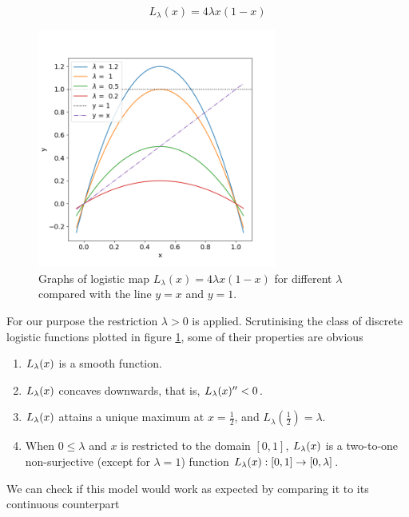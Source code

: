 \begin{equation}\label{eq_logistic}
	L_{\lambda}(x) = 4 \lambda x(1-x)
\end{equation}

\begin{figure}[t]
	\centering
	\includegraphics[width=0.7\textwidth]{./figures/logistic_map_diff_lambda.png}
	\caption{Graphs of logistic map $L_{\lambda}(x) = 4 \lambda x(1-x)$ for different $\lambda$ compared with the line $y=x$ and $y = 1$.} 
	\label{fig:logistic_map_diff_lambda}
\end{figure}


For our purpose the restriction $\lambda >0$ is applied.
Scrutinising the class of discrete logistic functions plotted in figure \ref{fig:logistic_map_diff_lambda}, some of their properties are obvious

\begin{enumerate}
	\item $L_{\lambda}(x)$ is a smooth function.
	\item $L_{\lambda}(x)$ concaves downwards, that is, $L_{\lambda}(x)'' < 0$.
	\item $L_{\lambda}(x)$ attains a unique maximum at $x = \frac{1}{2}$, and $L_{\lambda}(\frac{1}{2}) = \lambda$.
	\item When $0 \leq \lambda$ and $x$ is restricted to the domain $[0, 1]$, $L_{\lambda}(x)$ is a two-to-one non-surjective (except for $\lambda = 1$) function $L_{\lambda}(x): [0,1] \rightarrow [0,\lambda]$. 
\end{enumerate}


We can check if this model would work as expected by comparing it to its continuous counterpart 

